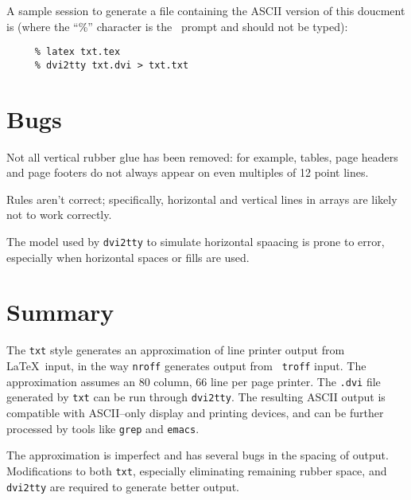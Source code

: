 A sample session to generate a file containing the ASCII version of
this doucment is (where the ``\%'' character is the \unix\ prompt and
should not be typed):
\begin{verbatim}
     % latex txt.tex
     % dvi2tty txt.dvi > txt.txt
\end{verbatim}

\section{Bugs}

Not all vertical rubber glue has been removed: for example, tables,
page headers and page footers do not always appear on even multiples
of 12 point lines.

Rules aren't correct; specifically, horizontal and vertical lines in
arrays are likely not to work correctly.

The model used by {\tt dvi2tty} to simulate horizontal spaacing is
prone to error, especially when horizontal spaces or fills are used.

\section{Summary}

The {\tt txt} style generates an approximation of line printer output
from \LaTeX\ input, in the way {\tt nroff} generates output from {\tt
troff} input. The approximation assumes an 80 column, 66 line per page
printer. The {\tt .dvi} file generated by {\tt txt} can be run through
{\tt dvi2tty}.  The resulting ASCII output is compatible with
ASCII--only display and printing devices, and can be further processed
by tools like {\tt grep} and {\tt emacs}.

The approximation is imperfect and has several bugs in the spacing of
output.  Modifications to both {\tt txt}, especially eliminating
remaining rubber space, and {\tt dvi2tty} are required to generate
better output.



